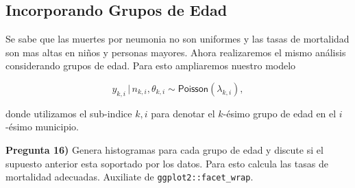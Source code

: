 \documentclass[
]{article}
\begin{document}
\hypertarget{incorporando-grupos-de-edad}{%
\subsection{Incorporando Grupos de
Edad}\label{incorporando-grupos-de-edad}}

Se sabe que las muertes por neumonia no son uniformes y las tasas de
mortalidad son mas altas en niños y personas mayores. Ahora realizaremos
el mismo análisis considerando grupos de edad. Para esto ampliaremos
nuestro modelo

\[ y_{k,i} \, | \, n_{k,i}, \theta_{k,i} \sim \textsf{Poisson}(\lambda_{k,i}),\]

donde utilizamos el sub-indice \(k,i\) para denotar el \(k\)-ésimo grupo
de edad en el \(i\)-ésimo municipio.

\textbf{Pregunta 16)} Genera histogramas para cada grupo de edad y
discute si el supuesto anterior esta soportado por los datos. Para esto
calcula las tasas de mortalidad adecuadas. Auxiliate de
\texttt{ggplot2::facet\_wrap}.
\end{document}
